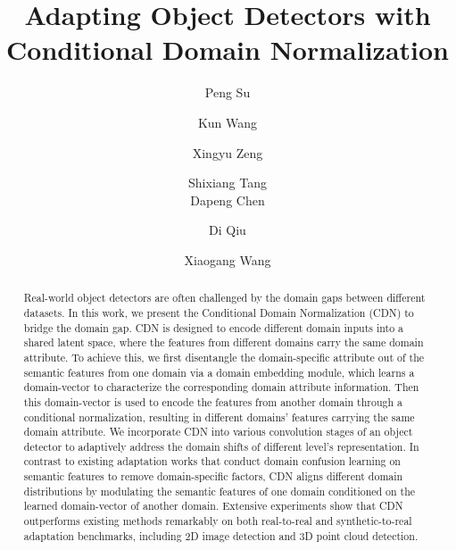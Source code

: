 \documentclass[runningheads]{llncs}
\begin{document}
\pagestyle{headings}
\mainmatter
\def\ECCVSubNumber{1358}  

\hfuzz=999pt

\title{Adapting Object Detectors with Conditional Domain Normalization}
\begin{comment}
\titlerunning{ECCV-20 submission ID \ECCVSubNumber}
\authorrunning{ECCV-20 submission ID \ECCVSubNumber}
\author{Anonymous ECCV submission}
\institute{Paper ID \ECCVSubNumber}
\end{comment}


\author{ Peng Su \and
Kun Wang \and
Xingyu Zeng \and
Shixiang Tang \\
Dapeng Chen \and
Di Qiu \and
Xiaogang Wang
}
\maketitle

\begin{abstract}
Real-world object detectors are often challenged by the domain gaps between different datasets.
In this work, we present the Conditional Domain Normalization (CDN) to bridge the domain gap.
CDN is designed to encode different domain inputs into a shared latent space, where the features from different domains carry the same domain attribute. To achieve this, we first disentangle the domain-specific attribute out of the semantic features from one domain via a domain embedding module, which learns a domain-vector to characterize the corresponding domain attribute information. Then this domain-vector is used to encode the features from another domain through a conditional normalization, resulting in different domains' features carrying the same domain attribute. We incorporate CDN into various convolution stages of an object detector to adaptively address the domain shifts of different level's representation. In contrast to existing adaptation works that conduct domain confusion learning on semantic features to remove domain-specific factors, CDN aligns different domain distributions by modulating the semantic features of one domain conditioned on the learned domain-vector of another domain. Extensive experiments show that CDN outperforms existing methods remarkably on both real-to-real and synthetic-to-real adaptation benchmarks, including 2D image detection and 3D point cloud detection.
\end{abstract}
\end{document}
